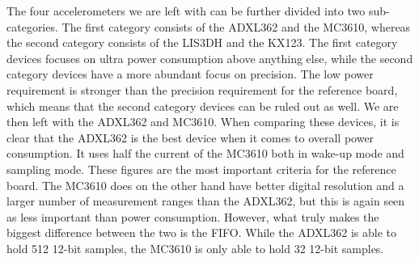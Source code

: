 The four accelerometers we are left with can be further divided into two sub-categories. The first category consists of the ADXL362 and the MC3610, whereas the second category consists of the LIS3DH and the KX123. The first category devices focuses on ultra power consumption above anything else, while the second category devices have a more abundant focus on precision. The low power requirement is stronger than the precision requirement for the reference board, which means that the second category devices can be ruled out as well. We are then left with the ADXL362 and MC3610. When comparing these devices, it is clear that the ADXL362 is the best device when it comes to overall power consumption. It uses half the current of the MC3610 both in wake-up mode and sampling mode. These figures are the most important criteria for the reference board. The MC3610 does on the other hand have better digital resolution and a larger number of measurement ranges than the ADXL362, but this is again seen as less important than power consumption. However, what truly makes the biggest difference between the two is the FIFO. While the ADXL362 is able to hold 512 12-bit samples, the MC3610 is only able to hold 32 12-bit samples. 